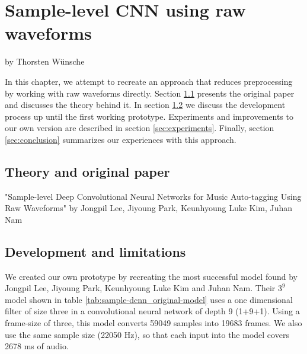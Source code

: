 \chapter{Sample-level CNN using raw waveforms}
by Thorsten Wünsche

\bigskip

In this chapter, we attempt to recreate an approach that reduces preprocessing by working with raw waveforms directly. Section \ref{sec:theory} presents the original paper and discusses the theory behind it. In section \ref{sec:development} we discuss the development process up until the first working prototype. Experiments and improvements to our own version are described in section \ref{sec:experiments}. Finally, section \ref{sec:conclusion} summarizes our experiences with this approach.

\section{Theory and original paper}
\label{sec:theory}

"Sample-level Deep Convolutional Neural Networks for Music Auto-tagging Using Raw Waveforms" \cite{DBLP:journals/corr/LeePKN17} by Jongpil Lee, Jiyoung Park, Keunhyoung Luke Kim, Juhan Nam

\section{Development and limitations}
\label{sec:development}
We created our own prototype by recreating the most successful model found by Jongpil Lee, Jiyoung Park, Keunhyoung Luke Kim and Juhan Nam. Their $3^9$ model shown in table \ref{tab:sample-dcnn_original-model} uses a one dimensional filter of size three in a convolutional neural network of depth 9 (1+9+1).  Using a frame-size of three, this model converts 59049 samples into 19683 frames. We also use the same sample size (22050 Hz), so that each input into the model covers 2678 ms of audio.



